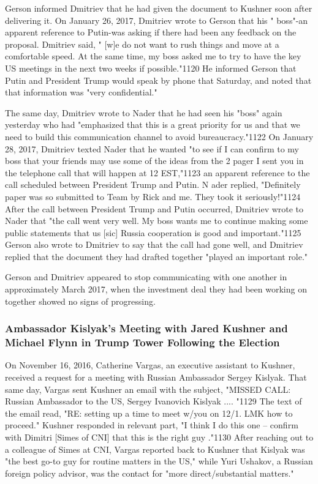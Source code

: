 Gerson informed Dmitriev that he had given the document to Kushner soon after delivering it.%
On January 26, 2017, Dmitriev wrote to Gerson that his " boss"-an apparent reference to Putin-was asking if there had been any feedback on the proposal.%
Dmitriev said, " [w]e do not want to rush things and move at a comfortable speed. At the same time, my boss asked me to try to have the key US meetings in the next two weeks if possible."1120 He informed Gerson that Putin and President Trump would speak by phone that Saturday, and noted that that information was "very confidential."%

The same day, Dmitriev wrote to Nader that he had seen his "boss" again yesterday who had "emphasized that this is a great priority for us and that we need to build this communication channel to avoid bureaucracy."1122 On January 28, 2017, Dmitriev texted Nader that he wanted "to see if I can confirm to my boss that your friends may use some of the ideas from the 2 pager I sent you in the telephone call that will happen at 12 EST,"1123 an apparent reference to the call scheduled between President Trump and Putin. N ader replied, "Definitely paper was so submitted to Team by Rick and me. They took it seriously!"1124 After the call between President Trump and Putin occurred, Dmitriev wrote to Nader that "the call went very well. My boss wants me to continue making some public statements that us [sic] Russia cooperation is good and important."1125 Gerson also wrote to Dmitriev to say that the call had gone well, and Dmitriev replied that the document they had drafted together "played an important role."%

Gerson and Dmitriev appeared to stop communicating with one another in approximately March 2017, when the investment deal they had been working on together showed no signs of progressing.%

\subsubsection{Ambassador Kislyak's Meeting with Jared Kushner and Michael Flynn in Trump Tower Following the Election}

On November 16, 2016, Catherine Vargas, an executive assistant to Kushner, received a request for a meeting with Russian Ambassador Sergey Kislyak.%
That same day, Vargas sent Kushner an email with the subject, "MISSED CALL: Russian Ambassador to the US, Sergey Ivanovich Kislyak .... "1129 The text of the email read, "RE: setting up a time to meet w/you on 12/1. LMK how to proceed." Kushner responded in relevant part, "I think I do this one -- confirm with Dimitri [Simes of CNI] that this is the right guy ."1130 After reaching out to a colleague of Simes at CNI, Vargas reported back to Kushner that Kislyak was "the best go-to guy for routine matters in the US," while Yuri Ushakov, a Russian foreign policy advisor, was the contact for "more direct/substantial matters."%

